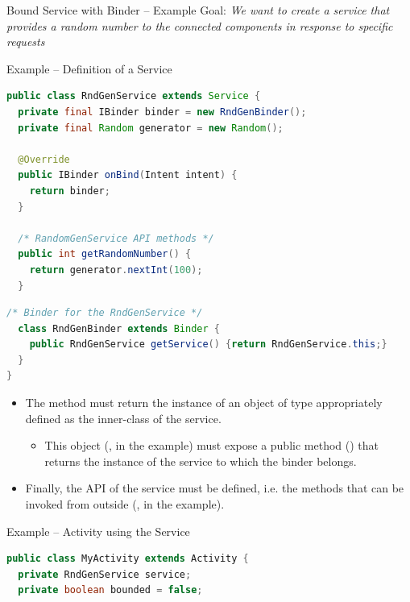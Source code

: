 \documentclass{beamer}
\begin{document}
  \begin{frame}{Bound Service with Binder -- Example}
    Goal: {\footnotesize \textit{We want to create a service that provides a
    random number to the connected components in response to specific requests}}
    \begin{exampleblock}{Example -- Definition of a Service}
      \begin{lstlisting}[language=Java]
public class RndGenService extends Service {
  private final IBinder binder = new RndGenBinder();
  private final Random generator = new Random();

  @Override
  public IBinder onBind(Intent intent) {
    return binder;
  }
  
  /* RandomGenService API methods */
  public int getRandomNumber() {
    return generator.nextInt(100);
  }
      \end{lstlisting}
    \end{exampleblock}  
    \begin{exampleblock}{\vspace{-10pt}}
      \begin{lstlisting}[language=Java]
  /* Binder for the RndGenService */
  class RndGenBinder extends Binder {
    public RndGenService getService() {return RndGenService.this;}
  }
}
      \end{lstlisting}
    \end{exampleblock}

    \begin{itemize}
      \item The  method must return the instance of an object of
      type  appropriately defined as the inner-class of the
      service.
      \begin{itemize}
        \item This object (, in the example) must expose
        a public method () that returns the instance of the
        service to which the binder belongs.
      \end{itemize}
      \item Finally, the API of the service must be defined, i.e. the methods
      that can be invoked from outside (, in the
      example).
    \end{itemize}

    \begin{exampleblock}{Example -- Activity using the Service}
      \begin{lstlisting}[language=Java]
public class MyActivity extends Activity {
  private RndGenService service;
  private boolean bounded = false;


\end{lstlisting}
\end{exampleblock}
\end{frame}
\end{document}
